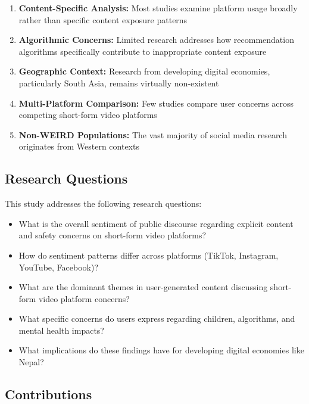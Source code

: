 \documentclass[11pt,a4paper]{article}
\begin{document}
\begin{enumerate}[leftmargin=*, itemsep=0.5em]
    \item \textbf{Content-Specific Analysis:} Most studies examine platform usage broadly rather than specific content exposure patterns \citep{valkenburg2022social}
    \item \textbf{Algorithmic Concerns:} Limited research addresses how recommendation algorithms specifically contribute to inappropriate content exposure \citep{ribeiro2020auditing}
    \item \textbf{Geographic Context:} Research from developing digital economies, particularly South Asia, remains virtually non-existent
    \item \textbf{Multi-Platform Comparison:} Few studies compare user concerns across competing short-form video platforms
    \item \textbf{Non-WEIRD Populations:} The vast majority of social media research originates from Western contexts
\end{enumerate}

\subsection{Research Questions}

This study addresses the following research questions:

\begin{itemize}[leftmargin=*, itemsep=0.3em]
    \item[\textbf{RQ1:}] What is the overall sentiment of public discourse regarding explicit content and safety concerns on short-form video platforms?
    \item[\textbf{RQ2:}] How do sentiment patterns differ across platforms (TikTok, Instagram, YouTube, Facebook)?
    \item[\textbf{RQ3:}] What are the dominant themes in user-generated content discussing short-form video platform concerns?
    \item[\textbf{RQ4:}] What specific concerns do users express regarding children, algorithms, and mental health impacts?
    \item[\textbf{RQ5:}] What implications do these findings have for developing digital economies like Nepal?
\end{itemize}

\subsection{Contributions}
\end{document}
